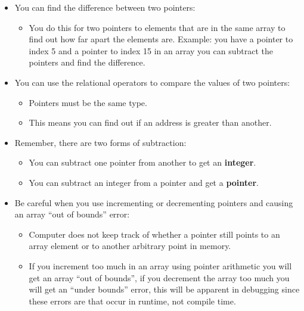 \begin{itemize}
    \item You can find the difference between two pointers:
        \begin{itemize}
            \item You do this for two pointers to elements that are in the same array to find out how far apart the elements are. Example: you have a pointer to index 5 and a pointer to index 15 in an array you can subtract the pointers and find the difference. 
        \end{itemize}
    
    \item You can use the relational operators to compare the values of two pointers:
        \begin{itemize}
            \item Pointers must be the same type.
            \item This means you can find out if an address is greater than another. 
        \end{itemize}
    
    \item Remember, there are two forms of subtraction:
        \begin{itemize}
            \item You can subtract one pointer from another to get an \textbf{integer}.
            \item You can subtract an integer from a pointer and get a \textbf{pointer}.
        \end{itemize}
    
    \item Be careful when you use incrementing or decrementing pointers and causing an array ``out of bounds'' error:
        \begin{itemize}
            \item Computer does not keep track of whether a pointer still points to an array element or to another arbitrary point in memory. 
            \item If you increment too much in an array using pointer arithmetic you will get an array ``out of bounds'', if you decrement the array too much you will get an ``under bounds'' error, this will be apparent in debugging since these errors are that occur in runtime, not compile time. 
        \end{itemize}
    

\end{itemize}

